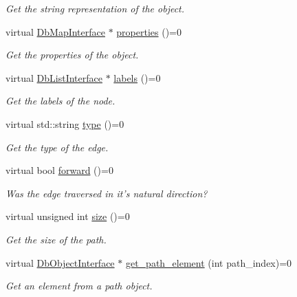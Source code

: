 \begin{DoxyCompactItemize}
\begin{DoxyCompactList}\small\item\em Get the string representation of the object. \end{DoxyCompactList}\item 
virtual \hyperlink{classDbMapInterface}{Db\-Map\-Interface} $\ast$ \hyperlink{classDbObjectInterface_aeede7445ae376fc03af884d5b6f1cb2e}{properties} ()=0
\begin{DoxyCompactList}\small\item\em Get the properties of the object. \end{DoxyCompactList}\item 
virtual \hyperlink{classDbListInterface}{Db\-List\-Interface} $\ast$ \hyperlink{classDbObjectInterface_a281232cca6b9f53f3881100b1a7e5915}{labels} ()=0
\begin{DoxyCompactList}\small\item\em Get the labels of the node. \end{DoxyCompactList}\item 
virtual std\-::string \hyperlink{classDbObjectInterface_a9c2f2de3322439ccdc8e16bd98388040}{type} ()=0
\begin{DoxyCompactList}\small\item\em Get the type of the edge. \end{DoxyCompactList}\item 
virtual bool \hyperlink{classDbObjectInterface_aa3c62699db544791329860136732ddde}{forward} ()=0
\begin{DoxyCompactList}\small\item\em Was the edge traversed in it's natural direction? \end{DoxyCompactList}\item 
virtual unsigned int \hyperlink{classDbObjectInterface_a52f1decaf825e88d3f3e977770af58a0}{size} ()=0
\begin{DoxyCompactList}\small\item\em Get the size of the path. \end{DoxyCompactList}\item 
virtual \hyperlink{classDbObjectInterface}{Db\-Object\-Interface} $\ast$ \hyperlink{classDbObjectInterface_ac6e90274f7a162ffc9c49570ff8f69b6}{get\-\_\-path\-\_\-element} (int path\-\_\-index)=0
\begin{DoxyCompactList}\small\item\em Get an element from a path object. \end{DoxyCompactList}\end{DoxyCompactItemize}


